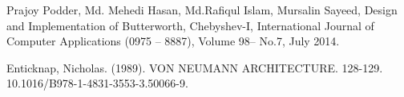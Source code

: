 \documentclass[letterpaper, 10 pt, conference]{ieeeconf}  %
\begin{document}






%
%
%







\begin{thebibliography}{99}

 Prajoy Podder, Md. Mehedi Hasan, Md.Rafiqul Islam, Mursalin Sayeed, Design and Implementation of Butterworth, Chebyshev-I, International Journal of Computer Applications (0975 – 8887), Volume 98– No.7, July 2014.

 Enticknap, Nicholas. (1989). VON NEUMANN ARCHITECTURE. 128-129. 10.1016/B978-1-4831-3553-3.50066-9. 




\end{thebibliography}
\end{document}
